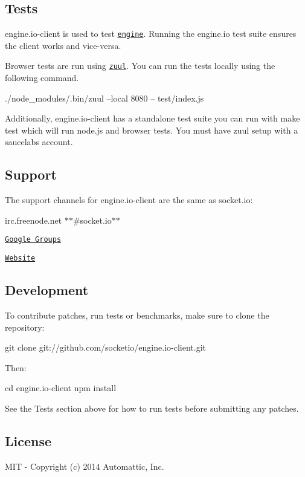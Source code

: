 \subsection*{Tests}

{\ttfamily engine.\+io-\/client} is used to test \href{http://github.com/socketio/engine.io}{\tt engine}. Running the {\ttfamily engine.\+io} test suite ensures the client works and vice-\/versa.

Browser tests are run using \href{https://github.com/defunctzombie/zuul}{\tt zuul}. You can run the tests locally using the following command.


\begin{DoxyCode}
./node\_modules/.bin/zuul --local 8080 -- test/index.js
\end{DoxyCode}


Additionally, {\ttfamily engine.\+io-\/client} has a standalone test suite you can run with {\ttfamily make test} which will run node.\+js and browser tests. You must have zuul setup with a saucelabs account.

\subsection*{Support}

The support channels for {\ttfamily engine.\+io-\/client} are the same as {\ttfamily socket.\+io}\+:
\begin{DoxyItemize}
\item irc.\+freenode.\+net $\ast$$\ast$\#socket.\+io$\ast$$\ast$
\item \href{http://groups.google.com/group/socket_io}{\tt Google Groups}
\item \href{http://socket.io}{\tt Website}
\end{DoxyItemize}

\subsection*{Development}

To contribute patches, run tests or benchmarks, make sure to clone the repository\+:


\begin{DoxyCode}
git clone git://github.com/socketio/engine.io-client.git
\end{DoxyCode}


Then\+:


\begin{DoxyCode}
cd engine.io-client
npm install
\end{DoxyCode}


See the {\ttfamily Tests} section above for how to run tests before submitting any patches.

\subsection*{License}

M\+IT -\/ Copyright (c) 2014 Automattic, Inc. 